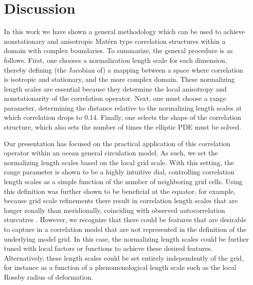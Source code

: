 \section{Discussion}
\label{sec:matern_discussion}

In this work we have shown a general methodology which can be used to achieve
nonstationary and anisotropic Mat\'ern type correlation structures within a
domain with complex boundaries.
To summarize, the general procedure is as follows.
First, one chooses a normalization length scale for each dimension, thereby
defining (the Jacobian of) a mapping between a space where correlation is
isotropic and stationary, and the more complex domain.
These normalizing length scales are essential because they determine the local
anisotropy and nonstationarity of the correlation operator.
Next, one must choose a range parameter, determining the distance relative to
the normalizing length scales at which correlation drops to 0.14.
Finally, one selects the shape of the correlation structure, which also sets the
number of times the elliptic PDE must be solved.

Our presentation has focused on the practical application of this
correlation operator within an ocean general circulation model.
As such, we set the normalizing length scales based on the local grid
scale.
With this setting, the range parameter is shown to be a highly intuitive dial,
controlling correlation length scales as a simple function of the number of
neighboring grid cells.
Using this definition was further shown to be beneficial at the equator, for
example, because grid scale refinements there result in correlation length
scales that are longer zonally than meridionally, coinciding with observed
autocorrelation sturcutres
\citep{meyers_space_1991}.
However, we recognize that there could be features that are desirable to capture
in a correlation model that are not represented in the definition of the
underlying model grid.
In this case, the normalizing length scales could be further tuned with
local factors or functions to achieve these desired features.
Alternatively, these length scales could be set entirely independently of
the grid, for instance as a function of a phenomenological length scale such as
the local Rossby radius of deformation.

